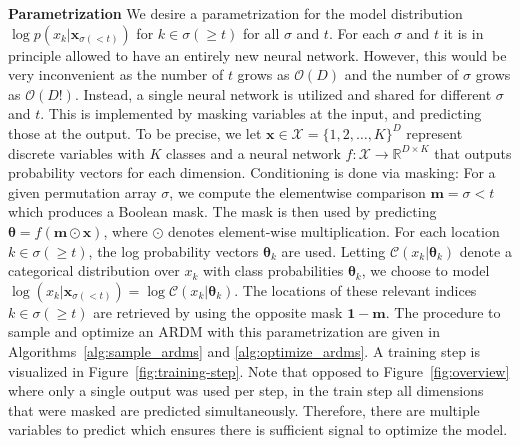 \documentclass{article} \usepackage{iclr2022_conference,times}
\def\vm{{\bm{m}}}
\def\vx{{\bm{x}}}
\begin{document}
\textbf{Parametrization} \hspace{.2cm}
We desire a parametrization for the model distribution $\log p(x_k | \vx_{\sigma(<t)})$ for $k \in \sigma(\geq t)$ for all $\sigma$ and $t$. For each $\sigma$ and $t$ it is in principle allowed to have an entirely new neural network. However, this would be very inconvenient as the number of $t$ grows as $\mathcal{O}(D)$ and the number of $\sigma$ grows as $\mathcal{O}(D!)$. Instead, a single neural network is utilized and shared for different $\sigma$ and $t$. This is implemented by masking variables at the input, and predicting those at the output. To be precise, we let $\vx \in \mathcal{X} = \{1, 2, \ldots, K\}^D$ represent discrete variables with $K$ classes and a neural network $f: \mathcal{X} \to \mathbb{R}^{D \times K}$ that outputs probability vectors for each dimension. Conditioning is done via masking: For a given permutation array $\sigma$, we compute the elementwise comparison $\vm = \sigma < t$ which produces a Boolean mask. The mask is then used by predicting $\boldsymbol{\theta} = f(\vm \odot \vx)$, where $\odot$ denotes element-wise multiplication. For each location $k \in \sigma(\geq t)$, the log probability vectors $\boldsymbol{\theta}_k$ are used. Letting $\mathcal{C}(x_k | \boldsymbol{\theta}_k)$ denote a categorical distribution over $x_k$ with class probabilities $\boldsymbol{\theta}_k$, we choose to model $\log (x_k | \vx_{\sigma(<t)}) = \log \mathcal{C}(x_k | \boldsymbol{\theta}_k)$. The locations of these relevant indices $k \in \sigma(\geq\! t)$ are retrieved by using the opposite mask $\boldsymbol{1} - \vm$. The procedure to sample and optimize an ARDM with this parametrization are given in Algorithms~\ref{alg:sample_ardms} and \ref{alg:optimize_ardms}. A training step is visualized in Figure~\ref{fig:training-step}. Note that opposed to Figure~\ref{fig:overview} where only a single output was used per step, in the train step all dimensions that were masked are predicted simultaneously. Therefore, there are multiple variables to predict which ensures there is sufficient signal to optimize the model.
\end{document}
